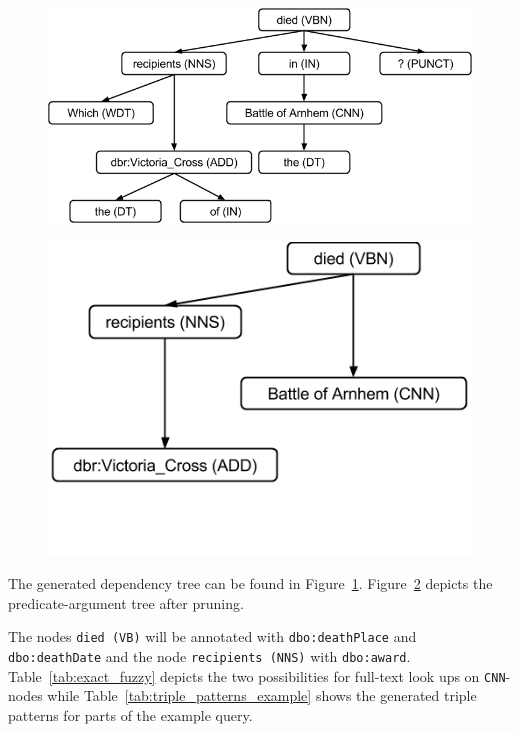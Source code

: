 \begin{figure}[htb!]
\centering
\includegraphics[scale=0.4]{part_03/ESWC_HAWK/hawk_tree_full}
\label{chahawk:fig:dependency_tree}
\end{figure}
\begin{figure}[htb!]
\centering
\includegraphics[trim={0 3cm  0 0},clip,scale=0.4]{part_03/ESWC_HAWK/hawk_tree_pruned}
\label{chahawk:fig:prunedtree}
\end{figure}


The generated dependency tree can be found in Figure~\ref{chahawk:fig:dependency_tree}.
Figure~\ref{chahawk:fig:prunedtree} depicts the predicate-argument tree after pruning.%

The nodes \texttt{died (VB)} will be annotated with \texttt{dbo:deathPlace} and \texttt{dbo:deathDate} and the node \texttt{recipients (NNS)} with \texttt{dbo:award}.
Table~\ref{tab:exact_fuzzy} depicts the two possibilities for full-text look ups on \texttt{CNN}-nodes while Table~\ref{tab:triple_patterns_example} shows the generated triple patterns for parts of the example query.
 

